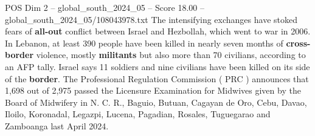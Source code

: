 \begin{textsample}{POS Dim 2 – global\_south\_2024\_05 – Score 18.00 – global\_south\_2024\_05/108043978.txt}
The intensifying exchanges have stoked fears of \textbf{all-out} conflict between Israel and Hezbollah, which went to war in 2006.
In Lebanon, at least 390 people have been killed in nearly seven months of \textbf{cross-border} violence, mostly \textbf{militants} but also more than 70 civilians, according to an AFP tally.
Israel says 11 soldiers and nine civilians have been killed on its side of the \textbf{border}.
The Professional Regulation Commission ( PRC ) announces that 1,698 out of 2,975 passed the Licensure Examination for Midwives given by the Board of Midwifery in N.
C.
R., Baguio, Butuan, Cagayan de Oro, Cebu, Davao, Iloilo, Koronadal, Legazpi, Lucena, Pagadian, Rosales, Tuguegarao and Zamboanga last April 2024.

\end{textsample}

